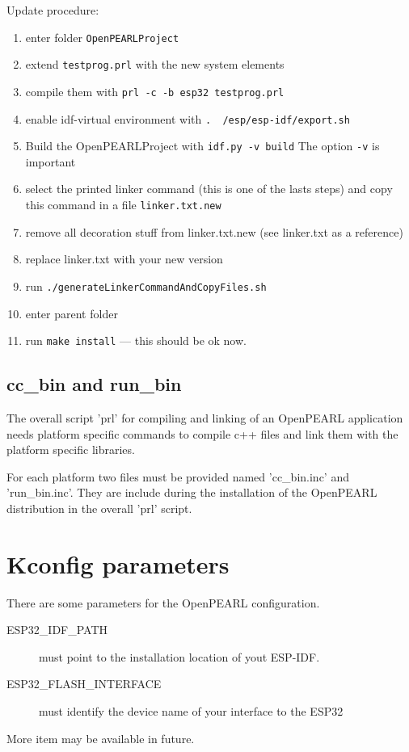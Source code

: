 Update procedure:

\begin{enumerate}
\item enter folder \texttt{OpenPEARLProject}
\item extend \texttt{testprog.prl} with the new system elements
\item compile them with \texttt{prl -c -b esp32 testprog.prl}
\item enable idf-virtual environment with \texttt{. ~/esp/esp-idf/export.sh}
\item Build the OpenPEARLProject with \texttt{idf.py -v build} \newline
   The option \texttt{-v} is important
\item select the printed linker command (this is one of the lasts steps)
   and copy this command in a file \texttt{linker.txt.new}
\item remove all decoration stuff from linker.txt.new (see linker.txt as
   a reference)
\item replace linker.txt with your new version
\item run \texttt{./generateLinkerCommandAndCopyFiles.sh}
\item enter parent folder
\item run \texttt{make install} --- this should be ok now.
\end{enumerate}

\subsection{cc\_bin and run\_bin}
The overall script 'prl' for compiling and linking of an OpenPEARL application
needs platform specific commands to compile c++ files and link them with the 
platform specific libraries.

For each platform two files must be provided named 'cc\_bin.inc'
and 'run\_bin.inc'. They are include during the installation of the OpenPEARL
distribution in the overall 'prl' script.

\section{Kconfig parameters}
There are some parameters for the OpenPEARL configuration.
\begin{description}
\item[ESP32\_IDF\_PATH] must point to the installation location of yout ESP-IDF.
\item[ESP32\_FLASH\_INTERFACE] must identify the device name
   of your interface to the ESP32
\end{description}
More item may be available in future.


